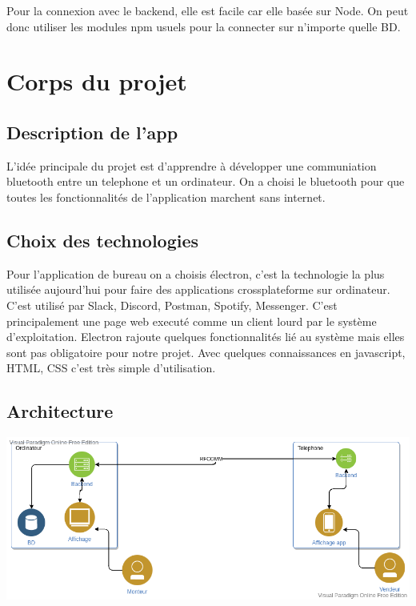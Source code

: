 \documentclass[12pt,fleqn]{article}
\begin{document}
Pour la connexion avec le backend, elle est facile car elle basée sur Node. On peut donc utiliser les modules npm usuels pour la connecter sur n’importe quelle BD. 


\section{Corps du projet}

\subsection{Description de l'app}
L'idée principale du projet est d'apprendre à développer une communiation bluetooth entre un telephone et un ordinateur. On a choisi le bluetooth pour que toutes les fonctionnalités de l'application marchent sans internet.

\subsection{Choix des technologies}
Pour l'application de bureau on a choisis électron, c'est la technologie la plus utilisée aujourd'hui pour faire des applications crossplateforme sur ordinateur. C'est utilisé par Slack, Discord, Postman, Spotify, Messenger. C'est principalement une page web executé comme un client lourd par le système d'exploitation. Electron rajoute quelques fonctionnalités lié au système mais elles sont pas obligatoire pour notre projet. Avec quelques connaissances en javascript, HTML, CSS c'est très simple d'utilisation.  

\subsection{Architecture}

\includegraphics[scale=0.5]{images/architecture_ift592.png}
\end{document}
